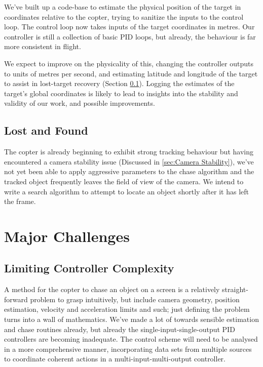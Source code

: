 \documentclass[11pt]{article}
\begin{document}
      We've built up a code-base to estimate the physical position of the target in coordinates relative to the copter, trying to sanitize the inputs to the control loop. The control loop now takes inputs of the target coordinates in metres.  Our controller is still a collection of basic PID loops, but already, the behaviour is far more consistent in flight.

      We expect to improve on the physicality of this, changing the controller outputs to units of metres per second, and estimating latitude and longitude of the target to assist in lost-target recovery (Section \ref{sec:Lost and Found}).  Logging the estimates of the target's global coordinates is likely to lead to insights into the stability and validity of our work, and possible improvements.


    \subsection{Lost and Found}
    \label{sec:Lost and Found}
      The copter is already beginning to exhibit strong tracking behaviour but having encountered a camera stability issue (Discussed in \ref{sec:Camera Stability}), we've not yet been able to apply aggressive parameters to the chase algorithm and the tracked object frequently leaves the field of view of the camera.
      We intend to write a search algorithm to attempt to locate an object shortly after it has left the frame.



  \section{Major Challenges}
    \subsection{Limiting Controller Complexity}
      A method for the copter to chase an object on a screen is a relatively straight-forward problem to grasp intuitively, but include camera geometry, position estimation, velocity and acceleration limits and such; just defining the problem turns into a wall of mathematics.  We've made a lot of towards sensible estimation and chase routines already, but already the single-input-single-output PID controllers are becoming inadequate. The control scheme will need to be analysed in a more comprehensive manner, incorporating data sets from multiple sources to coordinate coherent actions in a multi-input-multi-output controller.
\end{document}
